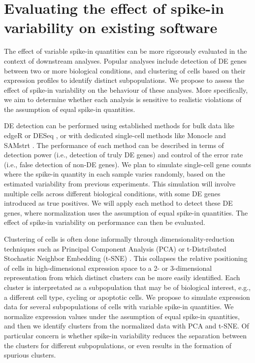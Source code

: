 \documentclass{article}
\begin{document}
\section{Evaluating the effect of spike-in variability on existing software}
The effect of variable spike-in quantities can be more rigorously evaluated in the context of downstream analyses.
Popular analyses include detection of DE genes between two or more biological conditions, and clustering of cells based on their expression profiles to identify distinct subpopulations.
We propose to assess the effect of spike-in variability on the behaviour of these analyses.
More specifically, we aim to determine whether each analysis is sensitive to realistic violations of the assumption of equal spike-in quantities.

DE detection can be performed using established methods for bulk data like edgeR \cite{robinson2010edgeR} or DESeq \cite{anders2010differential}, or with dedicated single-cell methods like Monocle \cite{trapnell2014dynamics} and SAMstrt \cite{katayama2013samstrt}.
The performance of each method can be described in terms of detection power (i.e., detection of truly DE genes) and control of the error rate (i.e., false detection of non-DE genes).
We plan to simulate single-cell gene counts where the spike-in quantity in each sample varies randomly, based on the estimated variability from previous experiments.
This simulation will involve multiple cells across different biological conditions, with some DE genes introduced as true positives.
We will apply each method to detect these DE genes, where normalization uses the assumption of equal spike-in quantities.
The effect of spike-in variability on performance can then be evaluated.

Clustering of cells is often done informally through dimensionality-reduction techniques such as Principal Component Analysis (PCA) or t-Distributed Stochastic Neighbor Embedding (t-SNE) \cite{van2008visualizing,julia2015sincell}.
This collapses the relative positioning of cells in high-dimensional expression space to a 2- or 3-dimensional representation from which distinct clusters can be more easily identified. 
Each cluster is interpretated as a subpopulation that may be of biological interest, e.g., a different cell type, cycling or apoptotic cells.
We propose to simulate expression data for several subpopulations of cells with variable spike-in quantities.
We normalize expression values under the assumption of equal spike-in quantities, and then we identify clusters from the normalized data with PCA and t-SNE.
Of particular concern is whether spike-in variability reduces the separation between the clusters for different subpopulations, or even results in the formation of spurious clusters.
\end{document}
